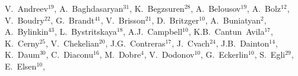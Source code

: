 \documentclass[12pt]{article}
\begin{document}
%
%
%
\begin{flushleft}

V.~Andreev$^{19}$,             %
A.~Baghdasaryan$^{31}$,        %
K.~Begzsuren$^{28}$,           %
A.~Belousov$^{19}$,            %
A.~Bolz$^{12}$,                %
V.~Boudry$^{22}$,              %
G.~Brandt$^{41}$,              %
V.~Brisson$^{21}$,             %
D.~Britzger$^{10}$,            %
A.~Buniatyan$^{2}$,            %
A.~Bylinkin$^{43}$,            %
L.~Bystritskaya$^{18}$,        %
A.J.~Campbell$^{10}$,          %
K.B.~Cantun~Avila$^{17}$,      %
K.~Cerny$^{25}$,               %
V.~Chekelian$^{20}$,           %
J.G.~Contreras$^{17}$,         %
J.~Cvach$^{24}$,               %
J.B.~Dainton$^{14}$,           %
K.~Daum$^{30}$,                %
C.~Diaconu$^{16}$,             %
M.~Dobre$^{4}$,                %
V.~Dodonov$^{10}$,             %
G.~Eckerlin$^{10}$,            %
S.~Egli$^{29}$,                %
E.~Elsen$^{10}$,               %

\end{flushleft}
\end{document}
